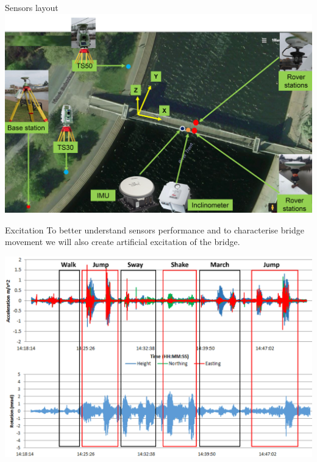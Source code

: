 \documentclass[11pt]{beamer}
\begin{document}
\begin{frame}{Sensors layout}%
	\centering
	\includegraphics[height=.7\textheight]{pic/layout.jpg}

\end{frame}

\begin{frame}{Excitation}%
	To better understand sensors performance and to characterise bridge movement we will also create artificial excitation of the bridge.

	\centering
	\includegraphics[height=.6\textheight]{pic/excitation.jpg}
\end{frame}
\end{document}
